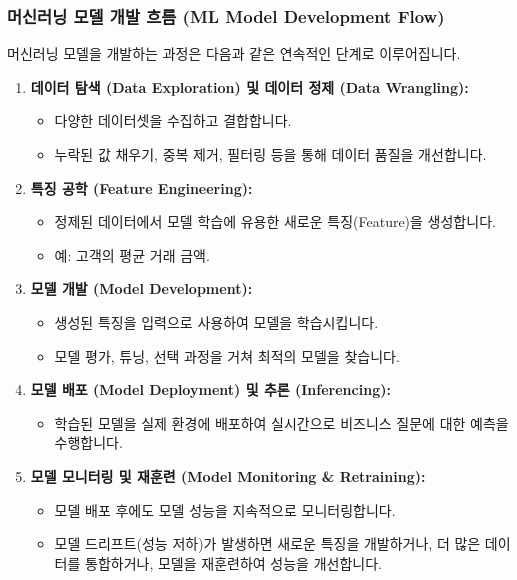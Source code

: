 \documentclass[11pt,a4paper]{article}
\begin{document}
\subsubsection*{머신러닝 모델 개발 흐름 (ML Model Development Flow)}
머신러닝 모델을 개발하는 과정은 다음과 같은 연속적인 단계로 이루어집니다.
\begin{enumerate}
    \item \textbf{데이터 탐색 (Data Exploration) 및 데이터 정제 (Data Wrangling):}
    \begin{itemize}
        \item 다양한 데이터셋을 수집하고 결합합니다.
        \item 누락된 값 채우기, 중복 제거, 필터링 등을 통해 데이터 품질을 개선합니다.
    \end{itemize}
    \item \textbf{특징 공학 (Feature Engineering):}
    \begin{itemize}
        \item 정제된 데이터에서 모델 학습에 유용한 새로운 특징(Feature)을 생성합니다.
        \item 예: 고객의 평균 거래 금액.
    \end{itemize}
    \item \textbf{모델 개발 (Model Development):}
    \begin{itemize}
        \item 생성된 특징을 입력으로 사용하여 모델을 학습시킵니다.
        \item 모델 평가, 튜닝, 선택 과정을 거쳐 최적의 모델을 찾습니다.
    \end{itemize}
    \item \textbf{모델 배포 (Model Deployment) 및 추론 (Inferencing):}
    \begin{itemize}
        \item 학습된 모델을 실제 환경에 배포하여 실시간으로 비즈니스 질문에 대한 예측을 수행합니다.
    \end{itemize}
    \item \textbf{모델 모니터링 및 재훈련 (Model Monitoring & Retraining):}
    \begin{itemize}
        \item 모델 배포 후에도 모델 성능을 지속적으로 모니터링합니다.
        \item 모델 드리프트(성능 저하)가 발생하면 새로운 특징을 개발하거나, 더 많은 데이터를 통합하거나, 모델을 재훈련하여 성능을 개선합니다.
    \end{itemize}
\end{enumerate}
\end{document}
